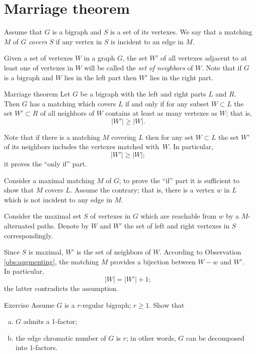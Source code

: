 \section*{Marriage theorem}

Assume that $G$ is a bigraph and $S$ is a set of its vertexes.
We say that a matching $M$ of $G$ \emph{covers} $S$ if any vertex in $S$ is incident to an edge in $M$.

Given a set of vertexes $W$ in a graph $G$, the set $W'$ of all vertexes  adjacent to at least one of vertexes in $W$ will be called the \emph{set of neighbors} of $W$.
Note that if $G$ is a bigraph and $W$ lies in the left part then $W'$ lies in the right part. 

\begin{thm}{Marriage theorem}
Let $G$ be a bigraph with the left and right parts $L$ and $R$.
Then $G$ has a matching which covers $L$ if and only if for any subset $W\subset L$ the set $W'\subset R$ of all neighbors of $W$ contains at least as many vertexes as $W$; that is, 
\[|W'|\ge |W|.\] 

\end{thm}

Note that if there is a matching $M$ covering $L$ then for any set  $W\subset L$ the set $W'$ of its neighbors includes the vertexes matched with~$W$.
In particular,
\[|W'|\ge |W|;\]
it proves the ``only if'' part.

Consider a maximal matching $M$ of $G$;
to prove the ``if'' part it is sufficient to show that $M$ covers $L$.
Assume the contrary; that is, there is a vertex $w$ in $L$ which is not incident to any edge in $M$.

Consider the maximal set $S$ of vertexes in $G$ which are reachable from $w$ by a 
$M$-alternated paths.
Denote by $W$ and $W'$ the set of left and right vertexes in $S$ correspondingly.

Since $S$ is maximal, $W'$ is the set of neighbors of $W$. 
According to Observation \ref{obs:augmenting}, the matching $M$ provides a bijection between $W-w$ and $W'$.
In particular, 
\[|W|=|W'|+1;\] 
the latter contradicts the assumption.
\qeds

\begin{thm}{Exercise}
Assume $G$ is a $r$-regular bigraph; $r\ge 1$.
Show that 
\begin{enumerate}[(a)]
\item $G$ admits a 1-factor;
\item the edge chromatic number of $G$ is $r$; in other words, $G$ can be decomposed into $1$-factors.
\end{enumerate}

\end{thm}


